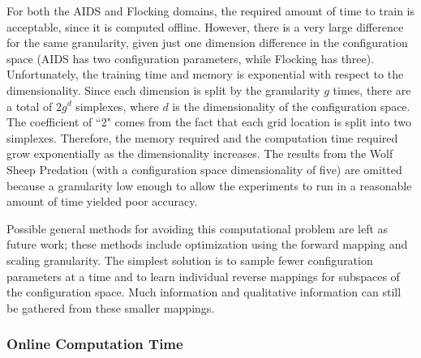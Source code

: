 For both the AIDS and Flocking domains, the required amount of time to train is acceptable, since it is computed offline.
However, there is a very large difference for the same granularity, given just one dimension difference in the configuration space (AIDS has two configuration parameters, while Flocking has three).
Unfortunately, the training time and memory is exponential with respect to the dimensionality.
Since each dimension is split by the granularity $g$ times, there are a total of $2 g^d$ simplexes, where $d$ is the dimensionality of the configuration space.
The coefficient of ``2" comes from the fact that each grid location is split into two simplexes.
Therefore, the memory required and the computation time required grow exponentially as the dimensionality increases.
The results from the Wolf Sheep Predation (with a configuration space dimensionality of five) are omitted because a granularity low enough to allow the experiments to run in a reasonable amount of time yielded poor accuracy.

Possible general methods for avoiding this computational problem are left as future work; these methods include optimization using the forward mapping and scaling granularity.
The simplest solution is to sample fewer configuration parameters at a time and to learn individual reverse mappings for subspaces of the configuration space.
Much information and qualitative information can still be gathered from these smaller mappings.


  \subsubsection{Online Computation Time}


